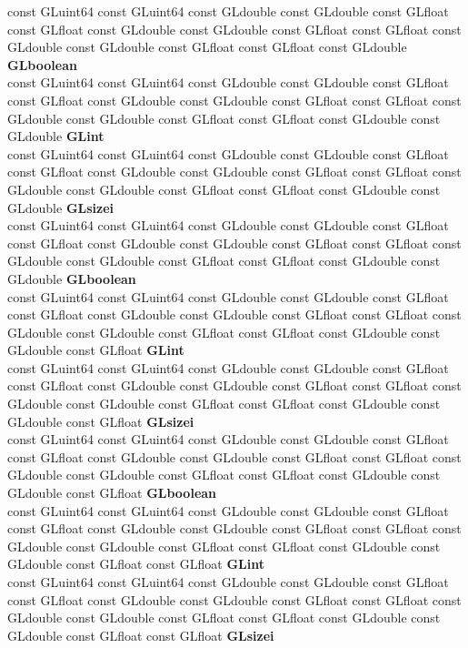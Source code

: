 \begin{DoxyCompactItemize}
\begin{tabbing}
\>const GLuint64 const GLuint64 const GLdouble const GLdouble const GLfloat const GLfloat const GLdouble const GLdouble const GLfloat const GLfloat const GLdouble const GLdouble const GLfloat const GLfloat const GLdouble {\bfseries GLboolean}\\
\>const GLuint64 const GLuint64 const GLdouble const GLdouble const GLfloat const GLfloat const GLdouble const GLdouble const GLfloat const GLfloat const GLdouble const GLdouble const GLfloat const GLfloat const GLdouble const GLdouble {\bfseries GLint}\\
\>const GLuint64 const GLuint64 const GLdouble const GLdouble const GLfloat const GLfloat const GLdouble const GLdouble const GLfloat const GLfloat const GLdouble const GLdouble const GLfloat const GLfloat const GLdouble const GLdouble {\bfseries GLsizei}\\
\>const GLuint64 const GLuint64 const GLdouble const GLdouble const GLfloat const GLfloat const GLdouble const GLdouble const GLfloat const GLfloat const GLdouble const GLdouble const GLfloat const GLfloat const GLdouble const GLdouble {\bfseries GLboolean}\\
\>const GLuint64 const GLuint64 const GLdouble const GLdouble const GLfloat const GLfloat const GLdouble const GLdouble const GLfloat const GLfloat const GLdouble const GLdouble const GLfloat const GLfloat const GLdouble const GLdouble const GLfloat {\bfseries GLint}\\
\>const GLuint64 const GLuint64 const GLdouble const GLdouble const GLfloat const GLfloat const GLdouble const GLdouble const GLfloat const GLfloat const GLdouble const GLdouble const GLfloat const GLfloat const GLdouble const GLdouble const GLfloat {\bfseries GLsizei}\\
\>const GLuint64 const GLuint64 const GLdouble const GLdouble const GLfloat const GLfloat const GLdouble const GLdouble const GLfloat const GLfloat const GLdouble const GLdouble const GLfloat const GLfloat const GLdouble const GLdouble const GLfloat {\bfseries GLboolean}\\
\>const GLuint64 const GLuint64 const GLdouble const GLdouble const GLfloat const GLfloat const GLdouble const GLdouble const GLfloat const GLfloat const GLdouble const GLdouble const GLfloat const GLfloat const GLdouble const GLdouble const GLfloat const GLfloat {\bfseries GLint}\\
\>const GLuint64 const GLuint64 const GLdouble const GLdouble const GLfloat const GLfloat const GLdouble const GLdouble const GLfloat const GLfloat const GLdouble const GLdouble const GLfloat const GLfloat const GLdouble const GLdouble const GLfloat const GLfloat {\bfseries GLsizei}\\

\end{tabbing}
\end{DoxyCompactItemize}
